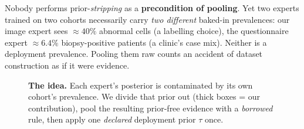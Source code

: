 \documentclass[sigplan,nonacm,screen]{acmart}
\begin{document}
\begin{gapbox}
Nobody performs prior-\emph{stripping} as a \textbf{precondition of pooling}. Yet two experts trained on two cohorts necessarily carry \emph{two different} baked-in prevalences: our image expert sees $\approx40\%$ abnormal cells (a labelling choice), the questionnaire expert $\approx6.4\%$ biopsy-positive patients (a clinic's case mix). Neither is a deployment prevalence. Pooling them raw counts an accident of dataset construction as if it were evidence.
\end{gapbox}

\begin{figure}[t]\centering
{}
\caption{\textbf{The idea.} Each expert's posterior is contaminated by its own cohort's prevalence. We divide that prior out (thick boxes = our contribution), pool the resulting prior-free evidence with a \emph{borrowed} rule, then apply one \emph{declared} deployment prior $\tau$ once.}
\label{fig:idea}
\end{figure}
\end{document}
